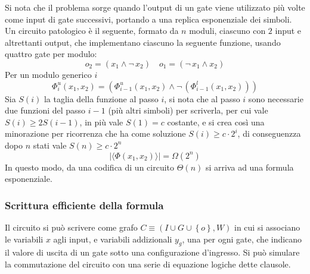 

Si nota che il problema sorge quando l'output di un gate viene utilizzato più volte come input di gate successivi, portando a una replica esponenziale dei simboli.
Un circuito patologico è il seguente, formato da $n$ moduli, ciascuno con $2$ input e altrettanti output, che implementano ciascuno la seguente funzione, usando quattro gate per modulo:
$$
o_2 = \left( x_1 \wedge \neg \, x_2 \right)
\quad
o_1 = \left( \neg \, x_1 \wedge x_2 \right)
$$
Per un modulo generico $i$
$$
\Phi_{i}^{u} \left( x_1, x_2 \right)
= \left( 
\Phi_{i-1}^{u} \left( x_1, x_2 \right)
\wedge \neg \, 
\left( 
\Phi_{i-1}^{l} \left( x_1, x_2 \right)
\right)
\right)
$$
Sia $S(i)$ la taglia della funzione al passo $i$, si nota che al passo $i$ sono necessarie due funzioni del passo $i-1$ (più altri simboli) per scriverla, per cui vale $S(i) \ge 2 S (i-1)$, in più vale $S(1)=c$ costante, e si crea così una minorazione per ricorrenza che ha come soluzione $S(i) \ge c \cdot 2^i$, di conseguenzza dopo $n$ stati vale $S(n) \ge c \cdot 2^n$
\begin{equation*}
    |\langle  \Phi \left( x_1, x_2 \right)  \rangle|
    = \Omega \left( 2^{n} \right)
\end{equation*}
In questo modo, da una codifica di un circuito $\Theta (n)$ si arriva ad una formula esponenziale.

\subsubsection{Scrittura efficiente della formula}

Il circuito si può scrivere come grafo
$C \equiv \left( I \cup G \cup \left\{ o \right\}, W \right)$
in cui si associano le variabili $x$ agli input, e variabili addizionali $y_g$, una per ogni gate, che indicano il valore di uscita di un gate sotto una configurazione d'ingresso. Si può simulare la commutazione del circuito con una serie di equazione logiche dette clausole.

